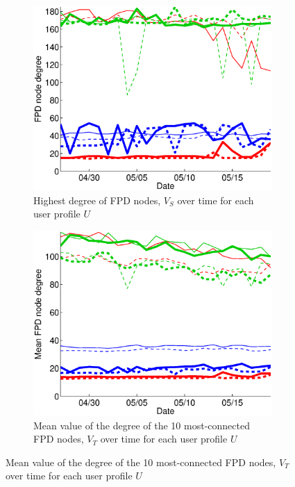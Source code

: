 \documentclass{sig-alternate}
\begin{document}
    \begin{figure}
   \centering
   \begin{subfigure}{.38\textwidth}
    \includegraphics[width=\textwidth]{figures/plots/first-mean-top1.eps}
    \caption{Highest degree of FPD nodes, $V_S$ over time for each user profile $U$}
    \label{fig:first_mean_top1_without_entities}
  \end{subfigure}
  \begin{subfigure}{.38\textwidth}
    \includegraphics[width=\textwidth]{figures/plots/first-mean-top10.eps}
    \caption{Mean value of the degree of the 10 most-connected FPD nodes, $V_T$ over time for each user profile $U$}
    \label{fig:first_mean_top10_without_entities}

\end{subfigure}
\end{figure}
\end{document}
